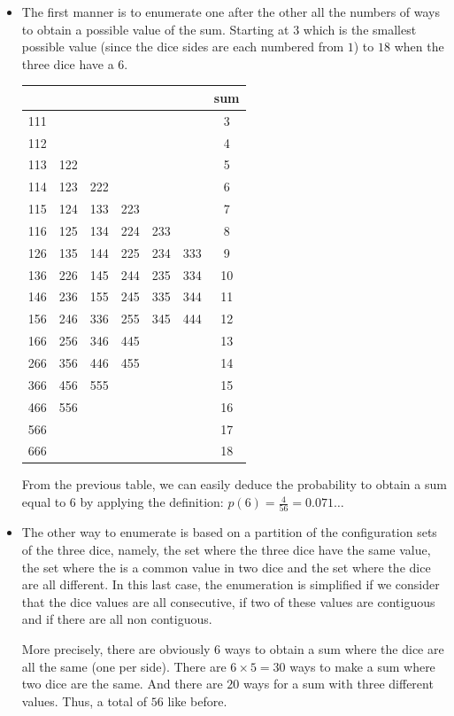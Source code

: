 \begin{itemize}
\item 
The first manner is to enumerate one after the other all the numbers of ways to obtain a possible value of the sum.
Starting at $3$ which is the smallest possible value (since the dice sides are each numbered from $1$) to $18$
when the three dice have a $6$.

\begin{tabular}{|c|c|c|c|c|c|c|}
\hline
 & & & & & & sum\\
\hline
111 & & & & & & 3\\
112 & & & & & & 4\\
113 & 122 & & & & & 5 \\
114 & 123 & 222 & & & & 6 \\
115 & 124 & 133 & 223 & & & 7\\
116 & 125 & 134 &  224 & 233 & & 8\\
126 & 135 & 144 & 225 & 234 & 333 & 9\\
136 &  226 & 145 & 244 & 235 & 334 & 10\\
146 & 236 & 155 & 245 & 335 & 344 & 11\\
156 & 246 & 336 & 255 & 345 & 444 & 12\\
166 & 256 & 346 & 445 & & & 13\\
266 & 356 & 446 & 455 & & & 14\\
366 & 456 & 555 & & & & 15\\
466 & 556 & & & & & 16\\
566 & & & & & & 17\\
666 & & & & & & 18\\
\hline
\end{tabular}
\smallskip

From the previous table, we can easily deduce the probability to obtain a sum equal to 6
by applying the definition: $p(6) = \frac{4}{56}=0.071\ldots$
\item 
The other way to enumerate is based on 
a partition of the configuration sets of the three dice, namely,
the set where the three dice have the same value, the set where the is a common value in two dice
and the set where the dice are all different. 
In this last case, the enumeration is simplified if we consider that the dice values are all consecutive,
if two of these values are contiguous and if there are all non contiguous.

More precisely, there are obviously $6$ ways to obtain a sum where the dice are all the same (one per side).
There are $6 \times 5 = 30$ ways to make a sum where two dice are the same. 
And there are $20$ ways for a sum with three different values. 
Thus, a total of $56$ like before.
\end{itemize}

